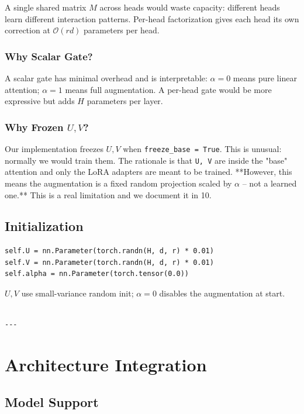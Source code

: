 A single shared matrix $M$ across heads would waste capacity: different heads 
learn different interaction patterns. Per-head factorization gives each head 
its own correction at $\mathcal{O}(r d)$ parameters per head.

\subsubsection{Why Scalar Gate?}

A scalar gate has minimal overhead and is interpretable: $\alpha = 0$ means 
pure linear attention; $\alpha = 1$ means full augmentation. A per-head gate 
would be more expressive but adds $H$ parameters per layer.

\subsubsection{Why Frozen $U, V$?}

Our implementation freezes $U, V$ when \texttt{freeze\_base = True}. This is 
unusual: normally we would train them. The rationale is that \texttt{U, V} are 
inside the "base" attention and only the LoRA adapters are meant to be 
trained. **However, this means the augmentation is a fixed random projection 
scaled by $\alpha$ -- not a learned one.** This is a real limitation and we 
document it in  10.

\subsection{Initialization}

\begin{lstlisting}
self.U = nn.Parameter(torch.randn(H, d, r) * 0.01)
self.V = nn.Parameter(torch.randn(H, d, r) * 0.01)
self.alpha = nn.Parameter(torch.tensor(0.0))
\end{lstlisting}

$U, V$ use small-variance random init; $\alpha = 0$ disables the 
augmentation at start.
\begin{lstlisting}

---
\end{lstlisting}


\section{Architecture Integration}

\subsection{Model Support}

